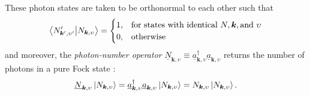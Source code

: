 These photon states are taken to be orthonormal to each other such that \cite{Shankar04,Townsend00,Fontana_82,kapitell4,wysin2011quantization} 
\begin{equation}\label{eq:photon_orthonormal}
  \braket{N_{\mathbold{k}',\upsilon'}'}{N_{\mathbold{k},\upsilon}} =
  \begin{cases}
    1, & \text{for states with identical } N, \mathbold{k}, \text{and } \upsilon \\
    0, & \text{otherwise}
  \end{cases}
 \end{equation}
and moreover, the \emph{photon-number operator} $\underline{N}_{\mathbold{k},\upsilon} \equiv \underline{a}^{\dagger}_{\mathbold{k},\upsilon} \underline{a}_{\mathbold{k},\upsilon}$ returns the number of photons in a pure Fock state \cite{Shankar04}:
\begin{equation}\label{eq:number_operator}
 \underline{N}_{\mathbold{k},\upsilon} \ket{N_{\mathbold{k},\upsilon}} = \underline{a}^{\dagger}_{\mathbold{k},\upsilon} \underline{a}_{\mathbold{k},\upsilon} \ket{N_{\mathbold{k},\upsilon}} = N_{\mathbold{k},\upsilon} \ket{N_{\mathbold{k},\upsilon}} .
 \end{equation}

